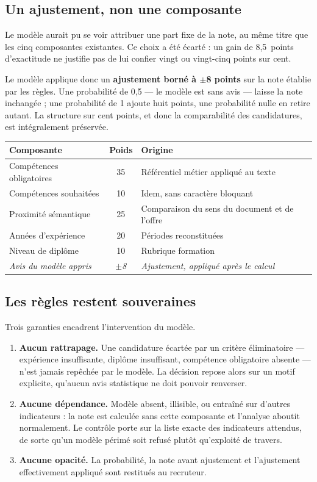 \documentclass[11pt,a4paper]{article}
\begin{document}
\subsection{Un ajustement, non une composante}
Le modèle aurait pu se voir attribuer une part fixe de la note, au même titre que les cinq composantes existantes. Ce choix a été écarté : un gain de 8,5~points d'exactitude ne justifie pas de lui confier vingt ou vingt-cinq points sur cent.

Le modèle applique donc un \textbf{ajustement borné à $\pm$8 points} sur la note établie par les règles. Une probabilité de 0,5 — le modèle est sans avis — laisse la note inchangée ; une probabilité de 1 ajoute huit points, une probabilité nulle en retire autant. La structure sur cent points, et donc la comparabilité des candidatures, est intégralement préservée.

\begin{center}
\small
\begin{tabular}{lcp{7.0cm}}
  \toprule
  \textbf{Composante} & \textbf{Poids} & \textbf{Origine} \\
  \midrule
  Compétences obligatoires & 35 & Référentiel métier appliqué au texte \\
  Compétences souhaitées & 10 & Idem, sans caractère bloquant \\
  Proximité sémantique & 25 & Comparaison du sens du document et de l'offre \\
  Années d'expérience & 20 & Périodes reconstituées \\
  Niveau de diplôme & 10 & Rubrique formation \\
  \midrule
  \textit{Avis du modèle appris} & \textit{$\pm$8} & \textit{Ajustement, appliqué après le calcul} \\
  \bottomrule
\end{tabular}
\end{center}

\subsection{Les règles restent souveraines}
Trois garanties encadrent l'intervention du modèle.

\begin{enumerate}[leftmargin=1.6em, nosep]
  \item \textbf{Aucun rattrapage.} Une candidature écartée par un critère éliminatoire — expérience insuffisante, diplôme insuffisant, compétence obligatoire absente — n'est jamais repêchée par le modèle. La décision repose alors sur un motif explicite, qu'aucun avis statistique ne doit pouvoir renverser.
  \item \textbf{Aucune dépendance.} Modèle absent, illisible, ou entraîné sur d'autres indicateurs : la note est calculée sans cette composante et l'analyse aboutit normalement. Le contrôle porte sur la liste exacte des indicateurs attendus, de sorte qu'un modèle périmé soit refusé plutôt qu'exploité de travers.
  \item \textbf{Aucune opacité.} La probabilité, la note avant ajustement et l'ajustement effectivement appliqué sont restitués au recruteur.
\end{enumerate}
\end{document}
